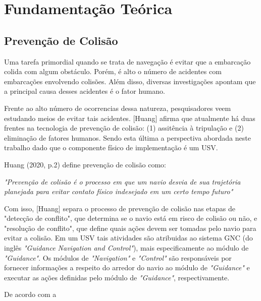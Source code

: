 \chapter{\label{chap:chap2}Fundamentação Teórica}


\section{Prevenção de Colisão}
Uma tarefa primordial quando se trata de navegação é evitar que a embarcação colida com algum obstáculo. Porém, é alto o número de acidentes com embarcações envolvendo colisões. Além disso, diversas investigações apontam que a principal causa desses acidentes é o fator humano.

Frente ao alto número de ocorrencias dessa natureza, pesquisadores veem estudando meios de evitar tais acidentes. [Huang] afirma que atualmente há duas frentes na tecnologia de prevenção de colisão: (1) assitência à tripulação e (2) eliminação de fatores humanos. Sendo esta última a perspectiva abordada neste trabalho dado que o componente físico de implementação é um USV.

Huang (2020, p.2) define prevenção de colisão como:
\begin{directcite}
    \textit{"Prevenção de colisão é o processo em que um navio desvia de sua trajetória planejada para evitar contato físico indesejado em um certo tempo futuro"}
\end{directcite}

Com isso, [Huang] separa o processo de prevenção de colisão nas etapas de "detecção de conflito", que determina se o navio está em risco de colisão ou não, e "resolução de conflito", que define quais ações devem ser tomadas pelo navio para evitar a colisão. Em um USV tais atividades são atribuidas ao sistema GNC (do inglês \textit{"Guidance Navigation and Control"}), mais especificamente ao módulo de \textit{"Guidance"}. Os módulos de \textit{"Navigation"} e \textit{"Control"} são responsáveis por fornecer informações a respeito do arredor do navio ao módulo de \textit{"Guidance"} e executar as ações definidas pelo módulo de \textit{"Guidance"}, respectivamente.

De acordo com a 

\subsection{}